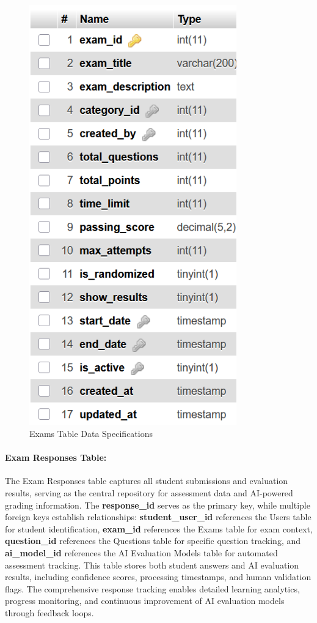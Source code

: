 \documentclass[12pt,a4paper,oneside]{book}
\begin{document}
\begin{figure}[H]
\centering
\includegraphics[width=0.8\textwidth]{assets/DBTable/Table4.7.png}
\caption{Exams Table Data Specifications}
\label{table:exams}
\end{figure}

\clearpage
\paragraph{Exam Responses Table:}
The Exam Responses table captures all student submissions and evaluation results, serving as the central repository for assessment data and AI-powered grading information. The \textbf{response\_id} serves as the primary key, while multiple foreign keys establish relationships: \textbf{student\_user\_id} references the Users table for student identification, \textbf{exam\_id} references the Exams table for exam context, \textbf{question\_id} references the Questions table for specific question tracking, and \textbf{ai\_model\_id} references the AI Evaluation Models table for automated assessment tracking. This table stores both student answers and AI evaluation results, including confidence scores, processing timestamps, and human validation flags. The comprehensive response tracking enables detailed learning analytics, progress monitoring, and continuous improvement of AI evaluation models through feedback loops.
\end{document}
